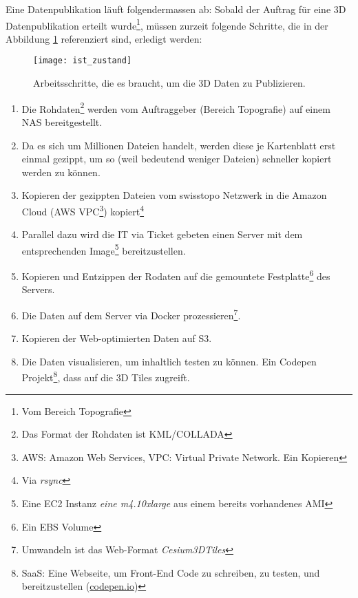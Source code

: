 Eine Datenpublikation läuft folgendermassen ab: Sobald der Auftrag für eine 3D Datenpublikation erteilt wurde\footnote{Vom Bereich Topografie}, müssen zurzeit folgende Schritte, die in der Abbildung \ref{fig:ist_zustand} referenziert sind, erledigt werden:

\begin{figure}[H]
	\centering
	\texttt{[image: ist\_zustand]}
	\caption{Arbeitsschritte, die es braucht, um die 3D Daten zu Publizieren.}
	\label{fig:ist_zustand}
\end{figure}

\begin{enumerate}
\item Die Rohdaten\footnote{Das Format der Rohdaten ist KML/COLLADA} werden vom Auftraggeber (Bereich Topografie) auf einem NAS bereitgestellt.
\item Da es sich um Millionen Dateien handelt, werden diese je Kartenblatt erst einmal gezippt, um so (weil bedeutend weniger Dateien) schneller kopiert werden zu können.
\item Kopieren der gezippten Dateien vom swisstopo Netzwerk in die Amazon Cloud (AWS VPC\footnote{AWS: Amazon Web Services, VPC: Virtual Private Network. Ein Kopieren}) kopiert\footnote{Via \emph{rsync}}
\item Parallel dazu wird die IT via Ticket gebeten einen Server mit dem entsprechenden Image\footnote{Eine EC2 Instanz \emph{eine m4.10xlarge} aus einem bereits vorhandenes AMI} bereitzustellen.
\item Kopieren und Entzippen der Rodaten auf die gemountete Festplatte\footnote{Ein EBS Volume} des Servers.
\item Die Daten auf dem Server via Docker prozessieren\footnote{Umwandeln ist das Web-Format \emph{Cesium3DTiles}}.
\item Kopieren der Web-optimierten Daten auf S3.
\item Die Daten visualisieren, um inhaltlich testen zu können. Ein Codepen Projekt\footnote{SaaS: Eine Webseite, um Front-End Code zu schreiben, zu testen, und bereitzustellen (\href{https://codepen.io}{codepen.io})}, dass auf die 3D Tiles zugreift.
\end{enumerate}

